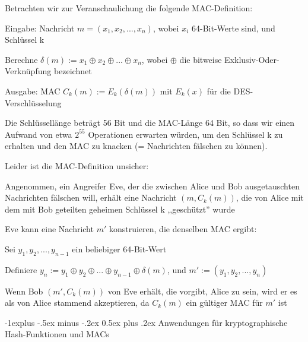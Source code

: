 \documentclass[a4paper]{article}
\makeatletter
\renewcommand{\subsection}{\@startsection{subsection}{2}{0mm}%
 {-1explus -.5ex minus -.2ex}%
 {0.5ex plus .2ex}%
 {\normalfont\normalsize\bfseries}}
\makeatother
\begin{document}
\begin{multicols}{3}
      \begin{itemize*}
            \item Betrachten wir zur Veranschaulichung die folgende MAC-Definition:
            \begin{itemize*}
                  \item Eingabe: Nachricht $m=(x_1,x_2,...,x_n)$, wobei $x_i$ 64-Bit-Werte sind, und Schlüssel k
                  \item Berechne $\delta(m):= x_1\oplus x_2\oplus...\oplus x_n$, wobei $\oplus$ die bitweise Exklusiv-Oder-Verknüpfung bezeichnet
                  \item Ausgabe: MAC $C_k(m):= E_k(\delta(m))$ mit $E_k(x)$ für die DES-Verschlüsselung
            \end{itemize*}
            \item Die Schlüssellänge beträgt 56 Bit und die MAC-Länge 64 Bit, so dass
            wir einen Aufwand von etwa $2^{55}$ Operationen erwarten
            würden, um den Schlüssel k zu erhalten und den MAC zu knacken (=
            Nachrichten fälschen zu können).
            \item Leider ist die MAC-Definition unsicher:
            \begin{itemize*}
                  \item Angenommen, ein Angreifer Eve, der die zwischen Alice und Bob ausgetauschten Nachrichten fälschen will, erhält eine Nachricht $(m,C_k(m))$, die von Alice mit dem mit Bob geteilten geheimen Schlüssel k ,,geschützt'' wurde
                  \item Eve kann eine Nachricht $m'$ konstruieren, die denselben MAC ergibt:
                  \begin{itemize*} \item Sei $y_1,y_2,...,y_{n-1}$ ein beliebiger 64-Bit-Wert \item Definiere $y_n:= y_1\oplus y_2\oplus...\oplus y_{n-1}\oplus \delta(m)$, und $m':=(y_1,y_2,...,y_n)$ \item Wenn Bob $(m',C_k(m))$ von Eve erhält, die vorgibt, Alice zu sein, wird er es als von Alice stammend akzeptieren, da $C_k(m)$ ein gültiger MAC für $m'$ ist \end{itemize*}
            \end{itemize*}
      \end{itemize*}


      \subsection{Anwendungen für kryptographische Hash-Funktionen und
            MACs}


\end{multicols}
\end{document}

